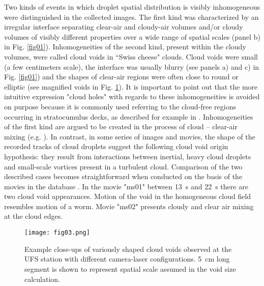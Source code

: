 \documentclass[../main.tex]{subfiles}
\begin{document}
Two kinds of events in which droplet spatial distribution is visibly inhomogeneous were distinguished in the collected images. The first kind was characterized by an irregular interface separating clear-air and cloudy-air volumes and/or cloudy volumes of visibly different properties over a wide range of spatial scales (panel b) in Fig. \ref{fig01}). Inhomogeneities of the second kind, present within the cloudy volumes, were called cloud voids in ``Swiss cheese" clouds. Cloud voids were small (a few centimeters scale), the interface was usually blurry (see panels a) and c) in Fig. \ref{fig01}) and the shapes of clear-air regions were often close to round or elliptic (see magnified voids in Fig. \ref{fig03}). It is important to point out that the more intuitive expression "cloud holes" with regards to these inhomogeneities is avoided on purpose because it is commonly used referring to the cloud-free regions occurring in stratocumulus decks, as described for example in \citet{Gerber_2005}. Inhomogeneities of the first kind are argued to be created in the process of cloud -- clear-air mixing (e.g. \cite{Warhaft_2000}). In contrast, in some series of images and movies, the shape of the recorded tracks of cloud droplets suggest the following cloud void origin hypothesis: they result from interactions between inertial, heavy cloud droplets and small-scale vortices present in a turbulent cloud. Comparison of the two described cases becomes straightforward when conducted on the basis of the movies in the database \citep{database}. In the movie "ms01" between 13~s and 22~s there are two cloud void appearances. Motion of the void in the homogeneous cloud field resembles motion of a worm. Movie "ms02" presents cloudy and clear air mixing at the cloud edges. \\

\begin{figure}[h]
\centering
\noindent\texttt{[image: fig03.png]}
\caption{Example close-ups of variously shaped cloud voids observed at the UFS station with different camera-laser configurations. 5~cm long segment is shown to represent spatial scale assumed in the void size calculation.}
\label{fig03}
\end{figure}
\end{document}
